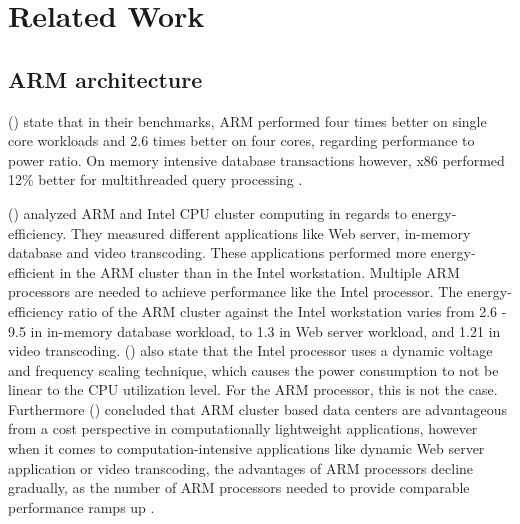 \section{Related Work}

\subsection{ARM architecture}

\citeauthor{maqbool2015evaluating} (\citeyear{maqbool2015evaluating})
state that in their benchmarks,
ARM performed four times better on single core workloads and
2.6 times better on four cores, 
regarding performance to power ratio.
On memory intensive database transactions however, 
x86 performed 12\% better for multithreaded query processing
\cite{maqbool2015evaluating}.

\citeauthor{ou2012energy} (\citeyear{ou2012energy}) analyzed ARM and Intel CPU cluster computing 
in regards to energy-efficiency. They measured different applications
like Web server, in-memory database and video transcoding. These
applications performed more energy-efficient in the ARM cluster than 
in the Intel workstation. Multiple ARM processors are needed to 
achieve performance like the Intel processor. 
The energy-efficiency ratio of the
ARM cluster against the Intel workstation varies from 2.6 - 9.5 in
in-memory database workload, to 1.3 in Web server workload, and 
1.21 in video transcoding. 
\citeauthor{ou2012energy} (\citeyear{ou2012energy}) also state that the Intel processor
uses a dynamic voltage and frequency scaling technique, which 
causes the power consumption to not be linear to the CPU utilization level.
For the ARM processor, this is not the case.
Furthermore \citeauthor{ou2012energy} (\citeyear{ou2012energy}) concluded that ARM cluster 
based data centers are advantageous from a cost perspective
in computationally lightweight applications,
however when it comes to computation-intensive applications
like dynamic Web server application or video transcoding, the advantages
of ARM processors decline gradually, as the number of ARM processors needed 
to provide comparable performance ramps up
\cite{ou2012energy}.